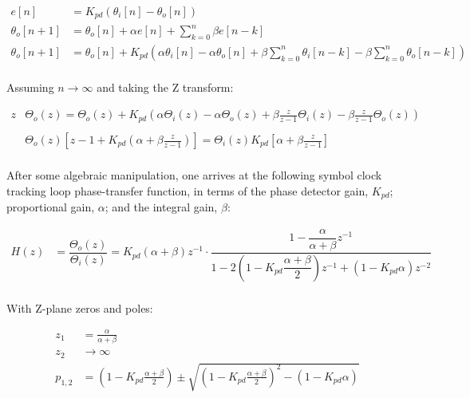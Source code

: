 \documentclass{article}
\begin{document}
\begin{align*}
   e[n] &= K_{pd}(\theta_i[n] - \theta_o[n]) \\
   \theta_o[n+1] &= \theta_o[n] + \alpha e[n] + \sum_{k=0}^{n}{\beta e[n-k]}\\
   \theta_o[n+1] &= \theta_o[n] + K_{pd} \left(
                    \alpha\theta_i[n] - \alpha\theta_o[n]
                  + \beta\sum_{k=0}^{n}{\theta_i[n-k]}
                  - \beta\sum_{k=0}^{n}{\theta_o[n-k]} \right) \\
\end{align*}

Assuming $n \rightarrow \infty$ and taking the Z transform:

\begin{align*}
    z&\Theta_o(z) = \Theta_o(z) + K_{pd} \left(
                    \alpha\Theta_i(z) - \alpha\Theta_o(z)
                  + \beta\frac{z}{z-1}\Theta_i(z)
                  - \beta\frac{z}{z-1}\Theta_o(z) \right) \\
    \\
    &\Theta_o(z)\left[z - 1 + 
                      K_{pd}\left(\alpha + \beta\frac{z}{z-1}\right)\right]
     = \Theta_i(z)K_{pd}\left[\alpha + \beta\frac{z}{z-1}\right]\\
\end{align*}

After some algebraic manipulation, one arrives at the following symbol clock
tracking loop phase-transfer function, in terms of the phase detector gain,
$K_{pd}$; proportional gain, $\alpha$; and the integral gain, $\beta$:

\begin{align*}
   H(z) &= \dfrac {\Theta_o(z)}{\Theta_i(z)}
         = K_{pd}(\alpha + \beta)z^{-1} \cdot
          \dfrac{
                 1
                 - \dfrac{\alpha}{\alpha + \beta} z^{-1}
                }
                {
                 1
                 - 2 \left(1 - K_{pd}\dfrac{\alpha + \beta}{2}\right) z^{-1}
                 + (1 - K_{pd}\alpha) z^{-2}
                } \\
\end{align*}

With Z-plane zeros and poles:

\begin{align*}
    z_{1} &= \frac{\alpha}{\alpha+\beta} \\
    z_{2} &\rightarrow \infty \\
    p_{1,2} &= \left(1-K_{pd}\frac{\alpha+\beta}{2}\right) \pm
           \sqrt{\left(1-K_{pd}\frac{\alpha+\beta}{2}\right)^{2}
                 - \left(1-K_{pd}\alpha\right)}\\
\end{align*}
\end{document}
